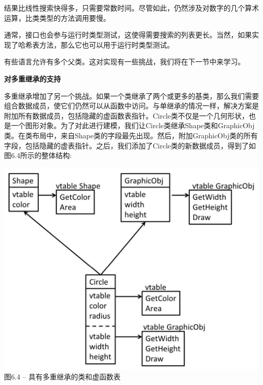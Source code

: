 结果比线性搜索快得多，只需要常数时间。尽管如此，仍然涉及对数字的几个算术运算，比类类型的方法调用要慢。\par

通常，接口也会参与运行时类型测试，这使得需要搜索的列表更长。当然，如果实现了哈希表方法，那么它也可以用于运行时类型测试。\par

有些语言允许有多个父类。这对实现有一些挑战，我们将在下一节中来学习。\par

\hspace*{\fill} \par %
\textbf{对多重继承的支持}

多重继承增加了另一个挑战。如果一个类继承了两个或更多的基类，那么我们需要组合数据成员，使它们仍然可以从函数中访问。与单继承的情况一样，解决方案是附加所有数据成员，包括隐藏的虚函数表指针。Circle类不仅是一个几何形状，也是一个图形对象。为了对此进行建模，我们让Circle类继承Shape类和GraphicObj类。在类布局中，来自Shape类的字段最先出现。然后，附加GraphicObj类的所有字段，包括隐藏的虚表指针。之后，我们添加了Circle类的新数据成员，得到了如图6.4所示的整体结构:\par

\hspace*{\fill} \par %
\begin{center}
	\includegraphics{content/2/chapter6/images/4.jpg}\\
	图6.4 – 具有多重继承的类和虚函数表
\end{center}

